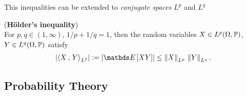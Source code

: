 \documentclass[11pt]{article}
\begin{document}
\begin{itemize}
This inequalities can be extended to \emph{conjugate spaces} $L^p$ and $L^q$ 
 \begin{proposition} (\textbf{H\"older's inequality}) \citep{vershynin2018high}\\
For $p,q \in (1, \infty)$, $1/p + 1/q = 1$, then the random variables $X \in L^p(\Omega, {\mathbb P})$, $Y \in L^q(\Omega, {\mathbb P})$ satisfy
\begin{align}
\abs{\inn{X}{Y}_{L^2}} := \abs{\E{}{XY}}  \le \norm{X}{L^p} \, \norm{Y}{L^q}. \label{ineqn: holder_inequality}
\end{align}
\end{proposition}

\end{itemize}

\subsection{Probability Theory}
\end{document}

